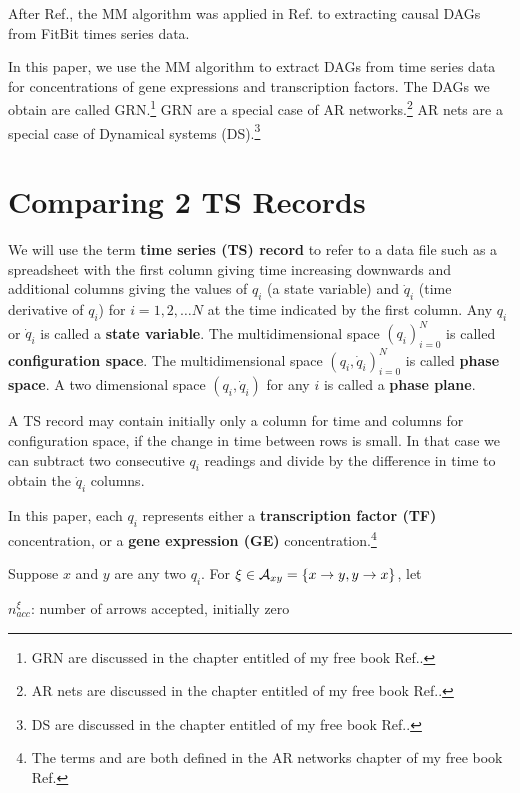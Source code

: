 \documentclass[12pt]{article}
\begin{document}
After Ref.\cite{mappa-mundi}, the MM algorithm was applied in Ref.\cite{causal-fitbit} to extracting causal DAGs from FitBit times
series data.

In this paper, we use the MM algorithm
to extract DAGs from time series data for
concentrations of
gene expressions and transcription factors.
The DAGs we obtain are called GRN.\footnote{GRN are discussed in the chapter entitled  of my free book Ref.\cite{Bayesuvius}.} GRN are a
special case of AR networks.\footnote{AR nets are 
discussed in the chapter entitled  of 
my free book Ref.\cite{Bayesuvius}.}
AR nets are a special case of Dynamical systems (DS).\footnote{DS are discussed in the
chapter entitled 
of my free book Ref.\cite{Bayesuvius}.}


\section{Comparing 2 TS Records}


We will use the term {\bf time series (TS) record}
to refer to
a data file such as a spreadsheet with the first column 
giving time increasing downwards and additional columns giving the values
of $q_i$ (a state variable) and $\dot{q}_i$ (time derivative of $q_i$) for $i=1, 2, \ldots N$
at the time indicated by the first column.
Any $q_i$ or $\dot{q}_i$ is called a {\bf state variable}.
The multidimensional space $(q_i)_{i=0}^{N}$
is called {\bf configuration space}.
The multidimensional space $(q_i, \dot{q}_i)_{i=0}^{N}$
is called {\bf phase space}.
A two dimensional space $(q_i, \dot{q}_i)$ for any 
$i$ is called a {\bf phase plane}.

A TS record may contain initially only a column 
for time and columns for configuration space,
if the change in time between rows is small. 
In that case we can subtract two consecutive
$q_i$ readings and divide by the difference
in time to obtain the $\dot{q}_i$ columns.

In this paper, each $q_i$ represents either a {\bf transcription
factor (TF)} concentration, or a {\bf gene expression (GE)} concentration.\footnote{The 
terms 
and  are both defined
in the AR networks chapter of my free book Ref.\cite{Bayesuvius}}


Suppose $x$ and $y$
are any two $q_i$. For $\xi \in
{\cal A}_{xy}=
\{x\rightarrow y, y\rightarrow x\}$, let

$n_{acc}^{\xi}$: number of arrows 
accepted, initially zero
\end{document}
